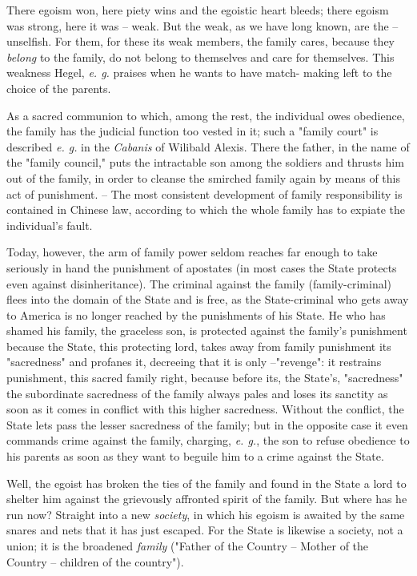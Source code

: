 There egoism won, here piety wins and the egoistic heart bleeds; there egoism 
was strong, here it was -- weak. But the weak, as we have long known, are the 
-- unselfish. For them, for these its weak members, the family cares, because 
they \textit{belong} to the family, do not belong to themselves and care for 
themselves. This weakness Hegel, \textit{e. g.} praises when he wants to have 
match- making left to the choice of the parents.

As a sacred communion to which, among the rest, the individual owes obedience, 
the family has the judicial function too vested in it; such a "{}family 
court"{} is described \textit{e. g.} in the \textit{Cabanis} \textit{}of 
Wilibald Alexis. There the father, in the name of the "{}family council,"{} 
puts the intractable son among the soldiers and thrusts him out of the family, 
in order to cleanse the smirched family again by means of this act of 
punishment. -- The most consistent development of family responsibility is 
contained in Chinese law, according to which the whole family has to expiate 
the individual's fault.

Today, however, the arm of family power seldom reaches far enough to take 
seriously in hand the punishment of apostates (in most cases the State 
protects even against disinheritance). The criminal against the family 
(family-criminal) flees into the domain of the State and is free, as the 
State-criminal who gets away to America is no longer reached by the 
punishments of his State. He who has shamed his family, the graceless son, is 
protected against the family's punishment because the State, this protecting 
lord, takes away from family punishment its "{}sacredness"{} and profanes it, 
decreeing that it is only --"{}revenge"{}: it restrains punishment, this 
sacred family right, because before its, the State's, "{}sacredness"{} the 
subordinate sacredness of the family always pales and loses its sanctity as 
soon as it comes in conflict with this higher sacredness. Without the 
conflict, the State lets pass the lesser sacredness of the family; but in the 
opposite case it even commands crime against the family, charging, \textit{e. 
g.}, the son to refuse obedience to his parents as soon as they want to 
beguile him to a crime against the State.

Well, the egoist has broken the ties of the family and found in the State a 
lord to shelter him against the grievously affronted spirit of the family. But 
where has he run now? Straight into a new \textit{society}, in which his 
egoism is awaited by the same snares and nets that it has just escaped. For 
the State is likewise a society, not a union; it is the broadened 
\textit{family} ("{}Father of the Country -- Mother of the Country -- children 
of the country"{}).


